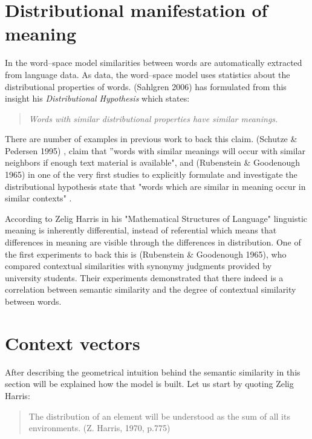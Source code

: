 \section{Distributional manifestation of meaning}
In the word--space model similarities between words are automatically extracted from language data. As data, the word--space model uses statistics about the distributional properties of words. (Sahlgren 2006) has formulated from this insight his \textit{Distributional Hypothesis} which states:
\begin{quotation}
\textit{Words with similar distributional properties have similar meanings.}
\end{quotation}
There are number of examples in previous work to back this claim. (Schutze \& Pedersen 1995) \cite{schutze_pedersen1995}, claim that  ''words with similar meanings will occur with similar neighbors if enough text material is available", and (Rubenstein \& Goodenough 1965)\cite{rubensteinG65} in one of the very first studies to explicitly formulate and investigate the distributional hypothesis state that  "words which are similar in meaning occur in similar contexts" .

According to Zelig Harris in his "Mathematical Structures of Language" linguistic meaning is inherently 
differential, instead of referential which means that differences in meaning are visible through the 
differences in distribution. One of the first experiments to back this is (Rubenstein \& Goodenough 1965)\cite{rubensteinG65}, who compared contextual similarities with synonymy judgments provided by university students. Their experiments demonstrated that there indeed is a correlation between semantic similarity and the degree of contextual similarity between words.

\section{Context vectors}
After describing the geometrical intuition behind the semantic similarity in this section will be explained how the model is built. Let us start by quoting Zelig Harris:
\begin{quotation}
The distribution of an element will be understood as the sum of all its environments. (Z. Harris, 1970, p.775)\cite{harris1970}
\end{quotation}

